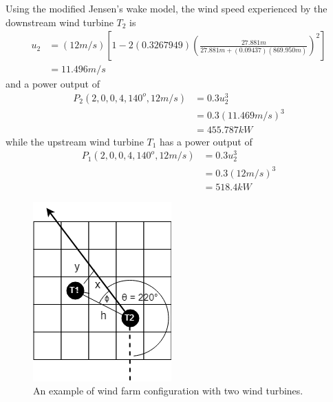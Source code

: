     Using the modified Jensen's wake model, the wind speed experienced by the downstream wind turbine $T_2$ is
    \begin{align*}
    	u_2
    	&= (12m/s)\left[ 1-2(0.3267949)\left( \frac{27.881m}{27.881m+(0.09437)(869.950m)} \right)^2 \right] \\
    	&= 11.496m/s
    \end{align*}
    and a power output of
    \begin{align*}
    	P_2(2,0,0,4,140^o,12m/s)
    	&= 0.3u_2^3 \\
    	&= 0.3(11.469m/s)^3 \\ 
    	&= 455.787kW
    \end{align*}
    while the upstream wind turbine $T_1$ has a power output of
    \begin{align*}
    	P_1(2,0,0,4,140^o,12m/s)
    	&= 0.3u_2^3 \\
    	&= 0.3(12m/s)^3 \\ 
    	&= 518.4kW
    \end{align*}
    
    \begin{figure}[H]
        \centering
        \includegraphics[width=0.4\linewidth]{Figures/sampleSmall2.png}
        \caption{An example of wind farm configuration with two wind turbines.}
        \label{sampleSmall2}
    \end{figure}
    
